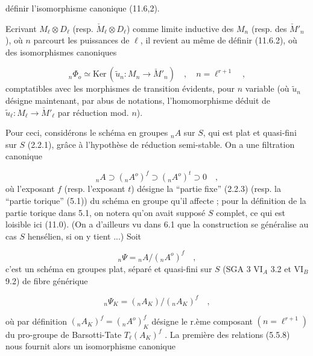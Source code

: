 
définir l'isomorphisme canonique (11.6,2).

Ecrivant $M_\ell \otimes D_\ell$ (resp. $\check{M}_\ell \otimes D_\ell$) comme limite inductive des $M_n$ (resp. des $\check{M}'_n$), où $n$ parcourt les puissances de $\ell$, il revient au même de définir (11.6.2), où des isomorphismes canoniques

\begin{equation}\tag{11.6.4}
{}_n\Phi_o \simeq \mathrm{Ker}\,(\tilde{u}_n : M_n \longrightarrow \check{M}'_n) \quad , \quad n = \ell^{r+1} \quad ,
\end{equation}
comptatibles avec les morphismes de transition évidents, pour $n$ variable (où $\tilde{u}_n$ désigne maintenant, par abus de notations, l'homomorphisme déduit de $\tilde{u}_\ell : M_\ell \longrightarrow \check{M}'_\ell$ par réduction mod. $n$).

Pour ceci, considérons le schéma en groupes ${}_nA$ sur $S$, qui est plat et quasi-fini sur $S$ (2.2.1), grâce à l'hypothèse de réduction semi-stable. On a une filtration canonique

\begin{equation}\tag{11.6.5}
{}_nA \supset ({}_nA^o)^f \supset ({}_nA^o)^t \supset 0 \quad ,
\end{equation}
où l'exposant $f$ (resp. l'exposant $t$) désigne la ``partie fixe'' (2.2.3) (resp. la ``partie torique'' (5.1)) du schéma en groupe qu'il affecte ; pour la définition de la partie torique dans 5.1, on notera qu'on avait supposé $S$ complet, ce qui est loisible ici (11.0). (On a d'ailleurs vu dans 6.1 que la construction se généralise au cas $S$ hensélien, si on y tient ...) Soit

\begin{equation}\tag{11.6.6}
{}_n\Psi = {}_nA/({}_nA^o)^f \quad ,
\end{equation}
c'est un schéma en groupes plat, séparé et quasi-fini sur $S$ (SGA 3 $\mathrm{VI}_A$ 3.2 et $\mathrm{VI}_B$ 9.2) de fibre générique

\begin{equation*}
{}_n\Psi_K = ({}_nA_K)/({}_nA_K)^f \quad ,
\end{equation*}


où par définition $({}_nA_K)^f = ({}_nA^o)^f_K$ désigne le r.ème composant $(n=\ell^{r+1})$ du pro-groupe de Barsotti-Tate $T_\ell(A_K)^f$ . La première des relations (5.5.8) nous fournit alors un isomorphisme canonique

